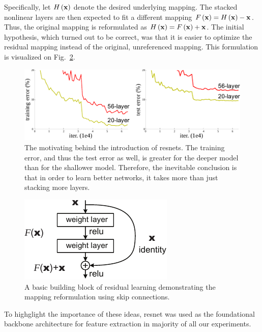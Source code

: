 Specifically, let ${H} \left( \mathbf{x} \right)$ denote the desired underlying mapping. The stacked nonlinear layers are then expected to fit a different mapping ${F} \left( \mathbf{x} \right) = {H} \left( \mathbf{x} \right) - \mathbf{x}$. Thus, the original mapping is reformulated as ${H} \left( \mathbf{x} \right) = {F} \left( \mathbf{x} \right) + \mathbf{x}$. The initial hypothesis, which turned out to be correct, was that it is easier to optimize the residual mapping instead of the original, unreferenced mapping. This formulation is visualized on Fig.~\ref{fig:SkipConnections}.

\begin{figure}[t]
    \centerline{\includegraphics[width=0.9\linewidth]{figures/theoretical_foundations/resnet_motivation.pdf}}
    \caption[\Gls{resnet} motivation]{The motivating behind the introduction of \glspl{resnet}. The training error, and thus the test error as well, is greater for the deeper model than for the shallower model. Therefore, the inevitable conclusion is that in order to learn better networks, it takes more than just stacking more layers. }
    \label{fig:ResnetMotivation}
\end{figure}

\begin{figure}[t]
    \centerline{\includegraphics[width=0.35\linewidth]{figures/theoretical_foundations/skip_connections.pdf}}
    \caption[Skip connections]{A basic building block of residual learning demonstrating the mapping reformulation using skip connections. }
    \label{fig:SkipConnections}
\end{figure}

To highglight the importance of these ideas, \Gls{resnet} was used as the foundational backbone architecture for feature extraction in majority of all our experiments.


